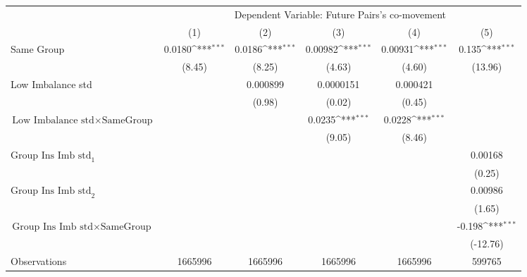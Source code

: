 {
\def\sym#1{\ifmmode^{#1}\else\(^{#1}\)\fi}
\begin{tabular}{l*{5}{c}}
\hline\hline
                &\multicolumn{5}{c}{Dependent Variable: Future Pairs's co-movement}                            \\\cmidrule(lr){2-6}
                &\multicolumn{1}{c}{(1)}         &\multicolumn{1}{c}{(2)}         &\multicolumn{1}{c}{(3)}         &\multicolumn{1}{c}{(4)}         &\multicolumn{1}{c}{(5)}         \\
\hline
Same Group      &   0.0180\sym{***}&   0.0186\sym{***}&  0.00982\sym{***}&  0.00931\sym{***}&    0.135\sym{***}\\
                &   (8.45)         &   (8.25)         &   (4.63)         &   (4.60)         &  (13.96)         \\
[1em]
Low Imbalance std&                  & 0.000899         &0.0000151         & 0.000421         &                  \\
                &                  &   (0.98)         &   (0.02)         &   (0.45)         &                  \\
[1em]
 $ \text{Low Imbalance std} \times {\text{SameGroup} } $ &                  &                  &   0.0235\sym{***}&   0.0228\sym{***}&                  \\
                &                  &                  &   (9.05)         &   (8.46)         &                  \\
[1em]
 $ {\text{Group Ins Imb std}_1} $ &                  &                  &                  &                  &  0.00168         \\
                &                  &                  &                  &                  &   (0.25)         \\
[1em]
 $ {\text{Group Ins Imb std}_2} $ &                  &                  &                  &                  &  0.00986         \\
                &                  &                  &                  &                  &   (1.65)         \\
[1em]
$ {\text{Group Ins Imb std} } \times {\text{SameGroup} }  $ &                  &                  &                  &                  &   -0.198\sym{***}\\
                &                  &                  &                  &                  & (-12.76)         \\
\hline
Observations    &  1665996         &  1665996         &  1665996         &  1665996         &   599765         \\

\end{tabular}}
